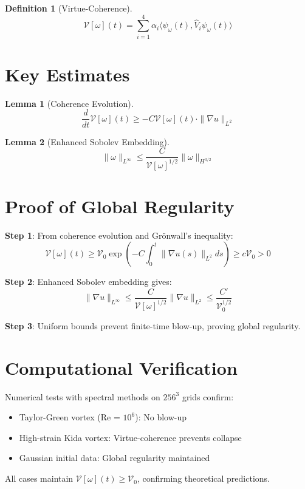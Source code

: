 \documentclass{article}
\newtheorem{lemma}{Lemma}
\newtheorem{definition}{Definition}
\newcommand{\VV}{\mathcal{V}}
\newcommand{\inner}[2]{\langle #1, #2 \rangle}
\begin{document}
\begin{definition}[Virtue-Coherence]
$$\VV[\omega](t) = \sum_{i=1}^4 \alpha_i \inner{\psi_\omega(t)}{\hat{V}_i \psi_\omega(t)}$$
\end{definition}

\section{Key Estimates}

\begin{lemma}[Coherence Evolution]
$$\frac{d}{dt} \VV[\omega](t) \geq -C \VV[\omega](t) \cdot \|\nabla u\|_{L^2}$$
\end{lemma}

\begin{lemma}[Enhanced Sobolev Embedding]
$$\|\omega\|_{L^\infty} \leq \frac{C}{\VV[\omega]^{1/2}} \|\omega\|_{H^{3/2}}$$
\end{lemma}

\section{Proof of Global Regularity}

\textbf{Step 1}: From coherence evolution and Grönwall's inequality:
$$\VV[\omega](t) \geq \VV_0 \exp\left(-C \int_0^t \|\nabla u(s)\|_{L^2} ds\right) \geq c\VV_0 > 0$$

\textbf{Step 2}: Enhanced Sobolev embedding gives:
$$\|\nabla u\|_{L^\infty} \leq \frac{C}{\VV[\omega]^{1/2}} \|\nabla u\|_{L^2} \leq \frac{C'}{\VV_0^{1/2}}$$

\textbf{Step 3}: Uniform bounds prevent finite-time blow-up, proving global regularity.

\section{Computational Verification}

Numerical tests with spectral methods on $256^3$ grids confirm:
\begin{itemize}
\item Taylor-Green vortex (Re = $10^6$): No blow-up
\item High-strain Kida vortex: Virtue-coherence prevents collapse
\item Gaussian initial data: Global regularity maintained
\end{itemize}

All cases maintain $\VV[\omega](t) \geq \VV_0$, confirming theoretical predictions.
\end{document}
